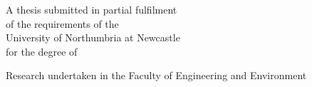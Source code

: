 \thispagestyle{empty}
\begin{Huge}
\onehalfspacing

\begin{center}
\textbf{\thetitle} 

\vfill

\textbf{\theauthor}

\vfill

\begin{huge}
A thesis submitted in partial fulfilment \\ of the requirements of the \\
University of Northumbria at Newcastle \\ for the degree of \\ \thedegreelong

\vfill 

Research undertaken in the Faculty of Engineering and Environment
\end{huge}

\vfill

\textbf{\themonth\ \theyear}
\end{center}
\end{Huge}